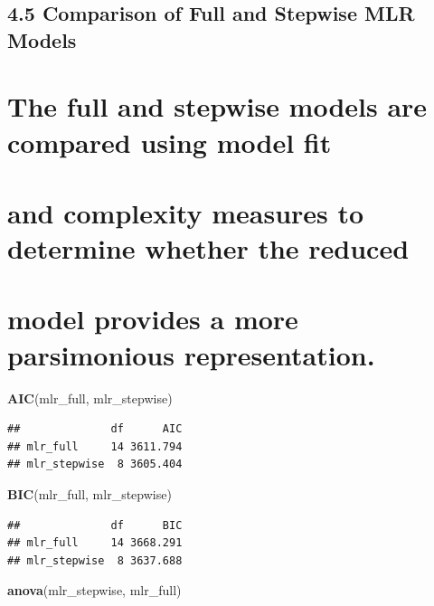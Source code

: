 \documentclass[
]{article}
\newenvironment{Shaded}{\begin{snugshade}}{\end{snugshade}}
\newcommand{\FunctionTok}[1]{\textcolor[rgb]{0.13,0.29,0.53}{\textbf{#1}}}
\newcommand{\NormalTok}[1]{#1}
\begin{document}
\subsection{4.5 Comparison of Full and Stepwise MLR
Models}\label{comparison-of-full-and-stepwise-mlr-models}

\section{The full and stepwise models are compared using model
fit}\label{the-full-and-stepwise-models-are-compared-using-model-fit}

\section{and complexity measures to determine whether the
reduced}\label{and-complexity-measures-to-determine-whether-the-reduced}

\section{model provides a more parsimonious
representation.}\label{model-provides-a-more-parsimonious-representation.}

\begin{Shaded}
\begin{Highlighting}[]
\FunctionTok{AIC}\NormalTok{(mlr\_full, mlr\_stepwise)}
\end{Highlighting}
\end{Shaded}

\begin{verbatim}
##              df      AIC
## mlr_full     14 3611.794
## mlr_stepwise  8 3605.404
\end{verbatim}

\begin{Shaded}
\begin{Highlighting}[]
\FunctionTok{BIC}\NormalTok{(mlr\_full, mlr\_stepwise)}
\end{Highlighting}
\end{Shaded}

\begin{verbatim}
##              df      BIC
## mlr_full     14 3668.291
## mlr_stepwise  8 3637.688
\end{verbatim}

\begin{Shaded}
\begin{Highlighting}[]
\FunctionTok{anova}\NormalTok{(mlr\_stepwise, mlr\_full)}
\end{Highlighting}
\end{Shaded}
\end{document}
